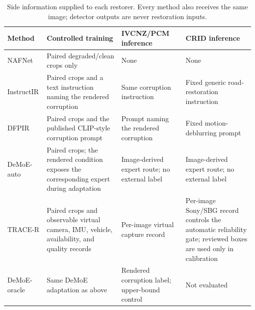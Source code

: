 \begin{table}[!t]
\centering
\caption{Side information supplied to each restorer. Every method also receives the same image; detector outputs are never restoration inputs.}
\label{tab:inference_inputs}
\scriptsize
\begin{tabular}{p{}p{}p{}p{}}
\toprule
Method & Controlled training & IVCNZ/PCM inference & CRID inference \\
\midrule
NAFNet & Paired degraded/clean crops only & None & None \\
InstructIR & Paired crops and a text instruction naming the rendered corruption & Same corruption instruction & Fixed generic road-restoration instruction \\
DFPIR & Paired crops and the published CLIP-style corruption prompt & Prompt naming the rendered corruption & Fixed motion-deblurring prompt \\
DeMoE-auto & Paired crops; the rendered condition exposes the corresponding expert during adaptation & Image-derived expert route; no external label & Image-derived expert route; no external label \\
TRACE-R & Paired crops and observable virtual camera, IMU, vehicle, availability, and quality records & Per-image virtual capture record & Per-image Sony/SBG record controls the automatic reliability gate; reviewed boxes are used only in calibration \\
DeMoE-oracle & Same DeMoE adaptation as above & Rendered corruption label; upper-bound control & Not evaluated \\
\bottomrule
\end{tabular}
\end{table}
